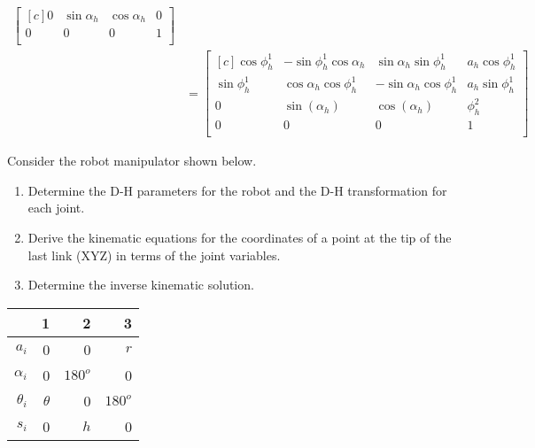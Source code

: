 \documentclass[onecolumn,10pt]{jhwhw}
\begin{document}
\begin{align*}
\begin{bmatrix*}[c]
0 & \sin \alpha_h &  \cos \alpha_h & 0\\
0 & 0 & 0 & 1 \\
\end{bmatrix*} \\
&=
\begin{bmatrix*}[c]
\cos \phi_h^1  &  -\sin \phi_h^1  \cos \alpha_h  &  \sin \alpha_h  \sin \phi_h^1  & a_h \cos \phi_h^1  \\
\sin \phi_h^1  &   \cos \alpha_h  \cos \phi_h^1  & -\sin \alpha_h  \cos \phi_h^1  & a_h \sin \phi_h^1  \\
             0 &                  \sin(\alpha_h) &                 \cos(\alpha_h) &           \phi_h^2 \\
             0 &                               0 &                              0 &                  1 \\
\end{bmatrix*}
\end{align*}

\problem{}
Consider the robot manipulator shown below.
\begin{enumerate}
    \item Determine the D-H parameters for the robot and the D-H transformation for each joint.
    \item Derive the kinematic equations for the coordinates of a point at the tip of the last link (XYZ) in terms of the joint variables.
    \item Determine the inverse kinematic solution.
\end{enumerate}

\begin{center}
\begin{tabular}{r|rrr}
& 1 & 2 & 3 \\
\midrule
$a_i$ &      0 & 0 & $r$ \\
$\alpha_i$ & 0 & $180^o$ & 0 \\    
$\theta_i$ & $\theta$ & 0 & $180^o$ \\ 
$s_i$ &      0 & $h$ & 0 \\
\end{tabular}
\end{center}
\end{document}
